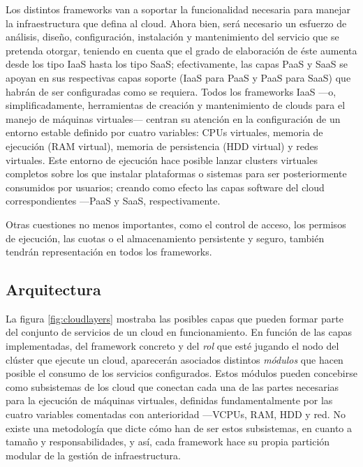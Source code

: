 Los distintos frameworks van a soportar la funcionalidad necesaria para manejar la infraestructura que defina al cloud. Ahora bien, ser\'a necesario un esfuerzo de an\'alisis, dise\~no, configuraci\'on, instalaci\'on y mantenimiento del servicio que se pretenda otorgar, teniendo en cuenta que el grado de elaboraci\'on de \'este aumenta desde los tipo IaaS hasta los tipo SaaS; efectivamente, las capas PaaS y SaaS se apoyan en sus respectivas capas soporte (IaaS para PaaS y PaaS para SaaS) que habr\'an de ser configuradas como se requiera. Todos los frameworks IaaS ---o, simplificadamente, herramientas de creaci\'on y mantenimiento de clouds para el manejo de m\'aquinas virtuales--- centran su atenci\'on en la configuraci\'on de un entorno estable definido por cuatro variables: CPUs virtuales, memoria de ejecuci\'on (RAM virtual), memoria de persistencia (HDD virtual) y redes virtuales. Este entorno de ejecuci\'on hace posible lanzar clusters virtuales completos sobre los que instalar plataformas o sistemas para ser posteriormente consumidos por usuarios; creando como efecto las capas software del cloud correspondientes ---PaaS y SaaS, respectivamente.\newline

Otras cuestiones no menos importantes, como el control de acceso, los permisos de ejecuci\'on, las cuotas o el almacenamiento persistente y seguro, tambi\'en tendr\'an representaci\'on en todos los frameworks.


\subsection{Arquitectura}\label{subsec:arquitecturacloud}
\noindent La figura \ref{fig:cloudlayers} mostraba las posibles capas que pueden formar parte del conjunto de servicios de un cloud en funcionamiento. En funci\'on de las capas implementadas, del framework concreto y del \emph{rol} que est\'e jugando el nodo del cl\'uster que ejecute un cloud, aparecer\'an asociados distintos \emph{m\'odulos} que hacen posible el consumo de los servicios configurados. Estos m\'odulos pueden concebirse como subsistemas de los cloud que conectan cada una de las partes necesarias para la ejecuci\'on de m\'aquinas virtuales, definidas fundamentalmente por las cuatro variables comentadas con anterioridad ---VCPUs, RAM, HDD y red. No existe una metodolog\'ia que dicte c\'omo han de ser estos subsistemas, en cuanto a tama\~no y responsabilidades, y as\'i, cada framework hace su propia partici\'on modular de la gesti\'on de infraestructura.\newline

